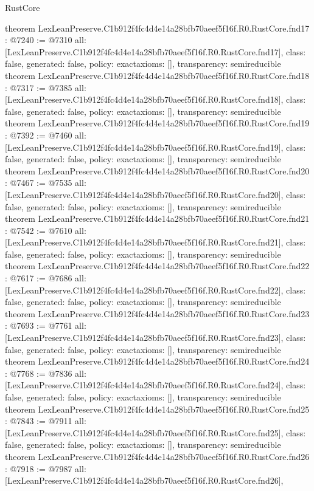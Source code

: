 \begin{lexlean}{RustCore}
\begin{coremodule}
theorem LexLeanPreserve.C1b912f4fc4d4e14a28bfb70aeef5f16f.R0.RustCore.fnd17 : @7240 := @7310 {
  all: [LexLeanPreserve.C1b912f4fc4d4e14a28bfb70aeef5f16f.R0.RustCore.fnd17],
  class: false,
  generated: false,
  policy: exact{axioms: []},
  transparency: semireducible
}
theorem LexLeanPreserve.C1b912f4fc4d4e14a28bfb70aeef5f16f.R0.RustCore.fnd18 : @7317 := @7385 {
  all: [LexLeanPreserve.C1b912f4fc4d4e14a28bfb70aeef5f16f.R0.RustCore.fnd18],
  class: false,
  generated: false,
  policy: exact{axioms: []},
  transparency: semireducible
}
theorem LexLeanPreserve.C1b912f4fc4d4e14a28bfb70aeef5f16f.R0.RustCore.fnd19 : @7392 := @7460 {
  all: [LexLeanPreserve.C1b912f4fc4d4e14a28bfb70aeef5f16f.R0.RustCore.fnd19],
  class: false,
  generated: false,
  policy: exact{axioms: []},
  transparency: semireducible
}
theorem LexLeanPreserve.C1b912f4fc4d4e14a28bfb70aeef5f16f.R0.RustCore.fnd20 : @7467 := @7535 {
  all: [LexLeanPreserve.C1b912f4fc4d4e14a28bfb70aeef5f16f.R0.RustCore.fnd20],
  class: false,
  generated: false,
  policy: exact{axioms: []},
  transparency: semireducible
}
theorem LexLeanPreserve.C1b912f4fc4d4e14a28bfb70aeef5f16f.R0.RustCore.fnd21 : @7542 := @7610 {
  all: [LexLeanPreserve.C1b912f4fc4d4e14a28bfb70aeef5f16f.R0.RustCore.fnd21],
  class: false,
  generated: false,
  policy: exact{axioms: []},
  transparency: semireducible
}
theorem LexLeanPreserve.C1b912f4fc4d4e14a28bfb70aeef5f16f.R0.RustCore.fnd22 : @7617 := @7686 {
  all: [LexLeanPreserve.C1b912f4fc4d4e14a28bfb70aeef5f16f.R0.RustCore.fnd22],
  class: false,
  generated: false,
  policy: exact{axioms: []},
  transparency: semireducible
}
theorem LexLeanPreserve.C1b912f4fc4d4e14a28bfb70aeef5f16f.R0.RustCore.fnd23 : @7693 := @7761 {
  all: [LexLeanPreserve.C1b912f4fc4d4e14a28bfb70aeef5f16f.R0.RustCore.fnd23],
  class: false,
  generated: false,
  policy: exact{axioms: []},
  transparency: semireducible
}
theorem LexLeanPreserve.C1b912f4fc4d4e14a28bfb70aeef5f16f.R0.RustCore.fnd24 : @7768 := @7836 {
  all: [LexLeanPreserve.C1b912f4fc4d4e14a28bfb70aeef5f16f.R0.RustCore.fnd24],
  class: false,
  generated: false,
  policy: exact{axioms: []},
  transparency: semireducible
}
theorem LexLeanPreserve.C1b912f4fc4d4e14a28bfb70aeef5f16f.R0.RustCore.fnd25 : @7843 := @7911 {
  all: [LexLeanPreserve.C1b912f4fc4d4e14a28bfb70aeef5f16f.R0.RustCore.fnd25],
  class: false,
  generated: false,
  policy: exact{axioms: []},
  transparency: semireducible
}
theorem LexLeanPreserve.C1b912f4fc4d4e14a28bfb70aeef5f16f.R0.RustCore.fnd26 : @7918 := @7987 {
  all: [LexLeanPreserve.C1b912f4fc4d4e14a28bfb70aeef5f16f.R0.RustCore.fnd26],
}
\end{coremodule}
\end{lexlean}
